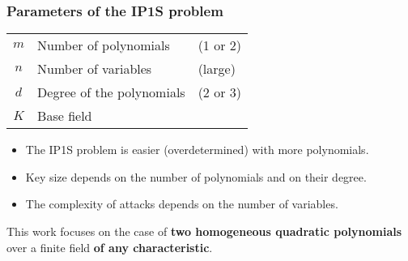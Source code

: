 \documentclass{beamer}%
\def\strong#1{{\bf\color{rouge}#1}}
\begin{document}
\begin{frame}\frametitle{Parameters of the IP1S problem}%

\hfil\begin{tabular}{cll}\toprule \color{rouge}$m$ & Number of
polynomials & (1 or 2)\\ \color{rouge}$n$ & Number of variables &
(large)\\ \color{rouge}$d$ & Degree of the polynomials & (2 or 3)\\
\color{rouge}$K$ & Base field\\\bottomrule
\end{tabular}

\bigskip
\begin{itemize}
\item The IP1S problem is easier (overdetermined) with more polynomials.
\item Key size depends on the number of polynomials and on their degree.
\item The complexity of attacks depends on the number of variables.
\end{itemize}

\bigskip
This work focuses on the case of \strong{two homogeneous quadratic
polynomials} over a finite field \strong{of any characteristic}.
\end{frame}%
\end{document}
